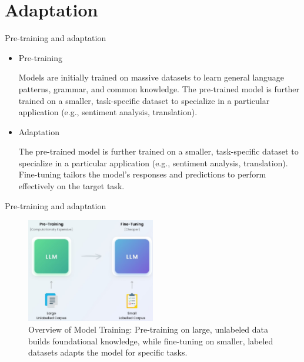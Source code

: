 \documentclass[serif, aspectratio=169]{beamer}
\begin{document}
\section{Adaptation}
\begin{frame}{Pre-training and adaptation}
    \begin{itemize}
        \item  
            \large{Pre-training}
            \vspace{0.5cm}
            \begin{outline}
                \1 Models are initially trained on massive datasets to learn general language patterns, grammar, and common knowledge.
                \vspace{0.2cm}
                \1 The pre-trained model is further trained on a smaller, task-specific dataset to specialize in a particular application (e.g., sentiment analysis, translation).
            \end{outline}
            \vspace{0.3cm}
        \item 
            \large{Adaptation}
            \vspace{0.5cm}
            \begin{outline}
                \1 The pre-trained model is further trained on a smaller, task-specific dataset to specialize in a particular application (e.g., sentiment analysis, translation).
                \1 Fine-tuning tailors the model's responses and predictions to perform effectively on the target task.
            \end{outline}
    \end{itemize}
\end{frame}

\begin{frame}{Pre-training and adaptation}
    \begin{figure}
        \centering
        \includegraphics[width=0.5\textwidth]{pic/image.jpg}
        \caption{Overview of Model Training: Pre-training on large, unlabeled data builds foundational knowledge, while fine-tuning on smaller, labeled datasets adapts the model for specific tasks.}
    \end{figure}
\end{frame}
\end{document}
